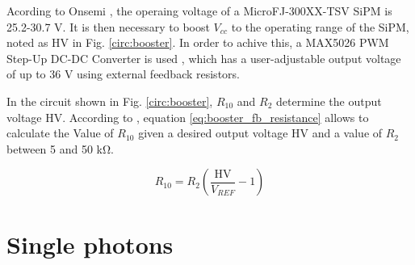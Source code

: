 Acording to Onsemi \cite{Onsemi_SiPM}, the operaing voltage of a MicroFJ-300XX-TSV SiPM is 25.2-30.7 V. It is then necessary to boost $V_{cc}$ to the operating range of the SiPM, noted as HV in Fig. \ref{circ:booster}. In order to achive this, a MAX5026 PWM Step-Up DC-DC Converter is used \cite{AnalogDevices_DC_DC}, which has a user-adjustable output voltage of up to 36 V using external feedback resistors.

In the circuit shown in Fig. \ref{circ:booster}, $R_{10}$ and $R_2$ determine the output voltage HV. According to \cite{AnalogDevices_DC_DC}, equation \eqref{eq:booster_fb_resistance} allows to calculate the Value of $R_{10}$ given a desired output voltage HV and a value of $R_2$ between 5 and 50 \unit{\kilo\ohm}.

\begin{equation}
    R_{10} = R_2\left(\frac{\text{HV}}{V_{REF}}-1\right) \label{eq:booster_fb_resistance}
\end{equation}

\section{Single photons}